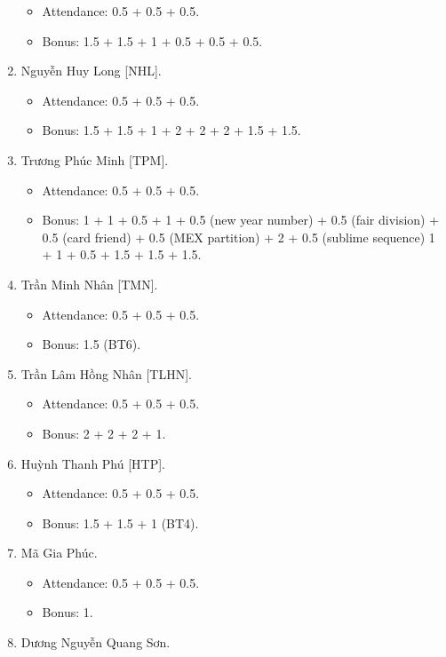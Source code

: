 \documentclass{article}
\begin{document}
\begin{enumerate}
\begin{itemize}
        \item Attendance: 0.5 + 0.5 + 0.5.
        \item Bonus: 1.5 + 1.5 + 1 + 0.5 + 0.5 + 0.5.
    \end{itemize}
    \item {\sc Nguyễn Huy Long [NHL].}
    \begin{itemize}
        \item Attendance: 0.5 + 0.5 + 0.5.
        \item Bonus: 1.5 + 1.5 + 1 + 2 + 2 + 2 + 1.5 + 1.5.
    \end{itemize}
    \item {\sc Trương Phúc Minh [TPM].}
    \begin{itemize}
        \item Attendance: 0.5 + 0.5 + 0.5.
        \item Bonus: 1 + 1 + 0.5 + 1 + 0.5 (new year number) + 0.5 (fair division) + 0.5 (card friend) + 0.5 (MEX partition) + 2 + 0.5 (sublime sequence) 1 + 1 + 0.5 + 1.5 + 1.5 + 1.5.
    \end{itemize}
    \item {\sc Trần Minh Nhân [TMN].}
    \begin{itemize}
        \item Attendance: 0.5 + 0.5 + 0.5.
        \item Bonus: 1.5 (BT6).
    \end{itemize}
    \item {\sc Trần Lâm Hồng Nhân [TLHN].}
    \begin{itemize}
        \item Attendance: 0.5 + 0.5 + 0.5.
        \item Bonus: 2 + 2 + 2 + 1.
    \end{itemize}
    \item {\sc Huỳnh Thanh Phú [HTP].}
    \begin{itemize}
        \item Attendance: 0.5 + 0.5 + 0.5.
        \item Bonus: 1.5 + 1.5 + 1 (BT4).
    \end{itemize}
    \item {\sc Mã Gia Phúc.}
    \begin{itemize}
        \item Attendance: 0.5 + 0.5 + 0.5.
        \item Bonus: 1.
    \end{itemize}
    \item {\sc Dương Nguyễn Quang Sơn.}

\end{enumerate}
\end{document}
